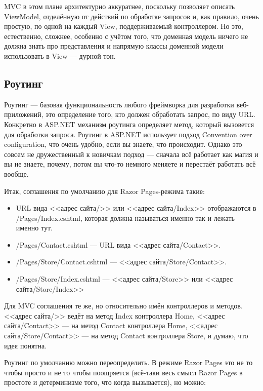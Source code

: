 \documentclass{../../text-style}
\begin{document}
MVC в этом плане архитектурно аккуратнее, поскольку позволяет описать ViewModel, отделённую от действий по обработке запросов и, как правило, очень простую, по одной на каждый View, поддерживаемый контроллером. Но это, естественно, сложнее, особенно с учётом того, что доменная модель ничего не должна знать про представления и напрямую классы доменной модели использовать в View --- дурной тон.

\subsection{Роутинг}

Роутинг --- базовая функциональность любого фреймворка для разработки веб-приложений, это определение того, кто должен обработать запрос, по виду URL. Конкретно в ASP.NET механизм роутинга определяет метод, который вызовется для обработки запроса. Роутинг в ASP.NET использует подход Convention over configuration, что очень удобно, если вы знаете, что происходит. Однако это совсем не дружественный к новичкам подход --- сначала всё работает как магия и вы не знаете, почему, потом вы что-то немного меняете и перестаёт работать всё вообще.

Итак, соглашения по умолчанию для Razor Pages-режима такие:

\begin{itemize}
    \item URL вида <<адрес сайта/>> или <<адрес сайта/Index>> отображаются в /Pages/Index.cshtml, которая должна называться именно так и лежать именно тут.
    \item /Pages/Contact.cshtml --- URL вида <<адрес сайта/Contact>>.
    \item /Pages/Store/Contact.cshtml --- <<адрес сайта/Store/Contact>>.
    \item /Pages/Store/Index.cshtml --- <<адрес сайта/Store>> или <<адрес сайта/Store/Index>>
\end{itemize}

Для MVC соглашения те же, но относительно имён контроллеров и методов. <<адрес сайта/>> ведёт на метод Index контроллера Home, <<адрес сайта/Contact>> --- на метод Contact контроллера Home, <<адрес сайта/Store/Contact>> --- на метод Contact контроллера Store, и думаю, что идея понятна.

Роутинг по умолчанию можно переопределить. В режиме Razor Pages это не то чтобы просто и не то чтобы поощряется (всё-таки весь смысл Razor Pages в простоте и детерминизме того, что когда вызывается), но можно:
\end{document}

